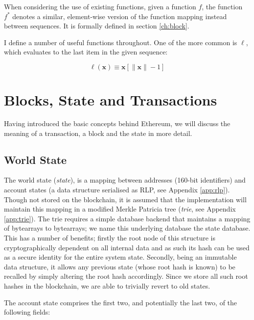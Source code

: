 \documentclass[9pt,oneside]{amsart}
\begin{document}
\begin{multicols}{2}
When considering the use of existing functions, given a function $f$, the function $f^*$ denotes a similar, element-wise version of the function mapping instead between sequences. It is formally defined in section \ref{ch:block}.

I define a number of useful functions throughout. One of the more common is $\ell$, which evaluates to the last item in the given sequence:

\begin{equation}
\ell(\mathbf{x}) \equiv \mathbf{x}[\lVert \mathbf{x} \rVert - 1]
\end{equation}

\section{Blocks, State and Transactions} \label{ch:bst}

Having introduced the basic concepts behind Ethereum, we will discuss the meaning of a transaction, a block and the state in more detail.

\subsection{World State} \label{ch:state}

The world state (\textit{state}), is a mapping between addresses (160-bit identifiers) and account states (a data structure serialised as RLP, see Appendix \ref{app:rlp}). Though not stored on the blockchain, it is assumed that the implementation will maintain this mapping in a modified Merkle Patricia tree (\textit{trie}, see Appendix \ref{app:trie}). The trie requires a simple database backend that maintains a mapping of bytearrays to bytearrays; we name this underlying database the state database. This has a number of benefits; firstly the root node of this structure is cryptographically dependent on all internal data and as such its hash can be used as a secure identity for the entire system state. Secondly, being an immutable data structure, it allows any previous state (whose root hash is known) to be recalled by simply altering the root hash accordingly. Since we store all such root hashes in the blockchain, we are able to trivially revert to old states.

The account state comprises the first two, and potentially the last two, of the following fields:


\end{multicols}
\end{document}
